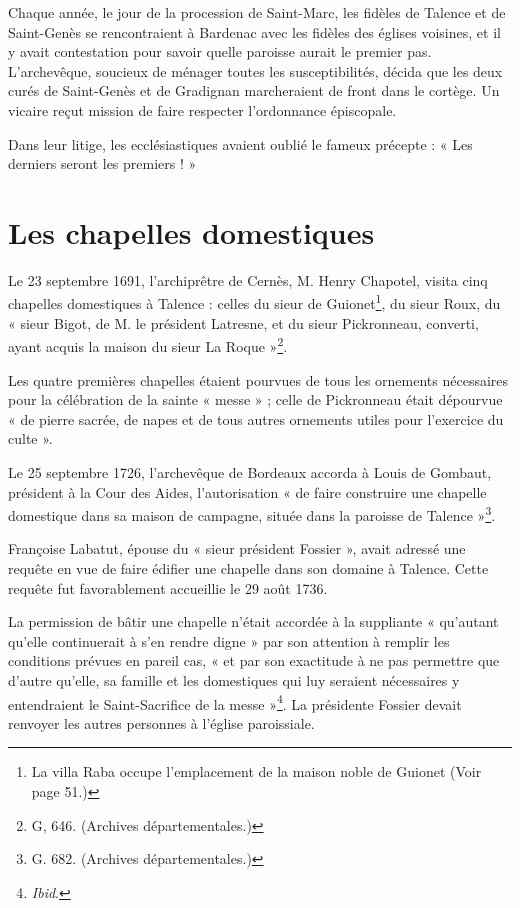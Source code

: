 Chaque année, le jour de la procession de Saint-Marc, les fidèles de Talence et de Saint-Genès se rencontraient à Bardenac avec les fidèles des églises voisines, et il y avait contestation pour savoir quelle paroisse aurait le premier pas. L'archevêque, soucieux de ménager toutes les susceptibilités, décida que les deux curés de Saint-Genès et de Gradignan marcheraient de front dans le cortège. Un vicaire reçut mission de faire respecter l'ordonnance épiscopale.

Dans leur litige, les ecclésiastiques avaient oublié le fameux précepte : « Les derniers seront les premiers ! »

\section{Les chapelles domestiques}

Le 23 septembre 1691, l'archiprêtre de Cernès, M. Henry Chapotel, visita cinq chapelles domestiques à Talence : celles du sieur de Guionet\footnote{La villa Raba occupe l'emplacement de la maison noble de Guionet (Voir page 51.)}, du sieur Roux, du « sieur Bigot, de M. le président Latresne, et du sieur Pickronneau, converti, ayant acquis la maison du sieur La Roque »\footnote{G, 646. (Archives départementales.)}.

Les quatre premières chapelles étaient pourvues de tous les ornements nécessaires pour la célébration de la sainte « messe » ; celle de Pickronneau était dépourvue « de pierre sacrée, de napes et de tous autres ornements utiles pour l'exercice du culte ».

Le 25 septembre 1726, l'archevêque de Bordeaux accorda à Louis de Gombaut, président à la Cour des Aides, l'autorisation « de faire construire une chapelle domestique dans sa maison de campagne, située dans la paroisse de Talence »\footnote{G. 682. (Archives départementales.)}.

Françoise Labatut, épouse du « sieur président Fossier », avait adressé une requête en vue de faire édifier une chapelle dans son domaine à Talence. Cette requête fut favorablement accueillie le 29 août 1736.

La permission de bâtir une chapelle n'était accordée à la suppliante « qu'autant qu'elle continuerait à s'en rendre digne » par son attention à remplir les conditions prévues en pareil cas, « et par son exactitude à ne pas permettre que d'autre qu'elle, sa famille et les domestiques qui luy seraient nécessaires y entendraient le Saint-Sacrifice de la messe »\footnote{\textit{Ibid}.}. La présidente Fossier devait renvoyer les autres personnes à l'église paroissiale.

